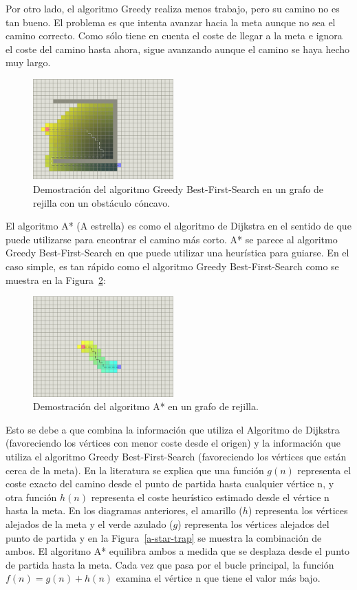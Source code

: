 \documentclass[reprint,amsmath,amssymb,aps]{revtex4-2}
\begin{document}
Por otro lado, el algoritmo Greedy realiza menos trabajo, pero su camino no es tan bueno. El problema es que intenta avanzar hacia la meta aunque no sea el camino correcto. Como sólo tiene en cuenta el coste de llegar a la meta e ignora el coste del camino hasta ahora, sigue avanzando aunque el camino se haya hecho muy largo.
 
\begin{figure}[H]
 	\centering
 	\includegraphics[width=0.48\textwidth]{greedy-trap.png}
 	\caption{Demostración del algoritmo Greedy Best-First-Search en un grafo de rejilla con un obstáculo cóncavo.}
 	\label{a-trap}
\end{figure}


El algoritmo A* (A estrella) es como el algoritmo de Dijkstra en el sentido de que puede utilizarse para encontrar el camino más corto. A* se parece al algoritmo Greedy Best-First-Search en que puede utilizar una heurística para guiarse. En el caso simple, es tan rápido como el algoritmo Greedy Best-First-Search como se muestra en la Figura~\ref{a-star}:

\begin{figure}[H]
	\centering
	\includegraphics[width=0.48\textwidth]{a-star.png}
	\caption{Demostración del algoritmo A* en un grafo de rejilla.}
	\label{a-star}
\end{figure}

Esto se debe a que combina la información que utiliza el Algoritmo de Dijkstra (favoreciendo los vértices con menor coste desde el origen) y la información que utiliza el algoritmo Greedy Best-First-Search (favoreciendo los vértices que están cerca de la meta). En la literatura se explica que una función $g(n)$ representa el coste exacto del camino desde el punto de partida hasta cualquier vértice n, y otra función $h(n)$ representa el coste heurístico estimado desde el vértice n hasta la meta. En los diagramas anteriores, el amarillo ($h$) representa los vértices alejados de la meta y el verde azulado ($g$) representa los vértices alejados del punto de partida y en la Figura~\ref{a-star-trap} se muestra la combinación de ambos. El algoritmo A* equilibra ambos a medida que se desplaza desde el punto de partida hasta la meta. Cada vez que pasa por el bucle principal, la función $f(n)=g(n)+h(n)$ examina el vértice n que tiene el valor más bajo.
\end{document}
